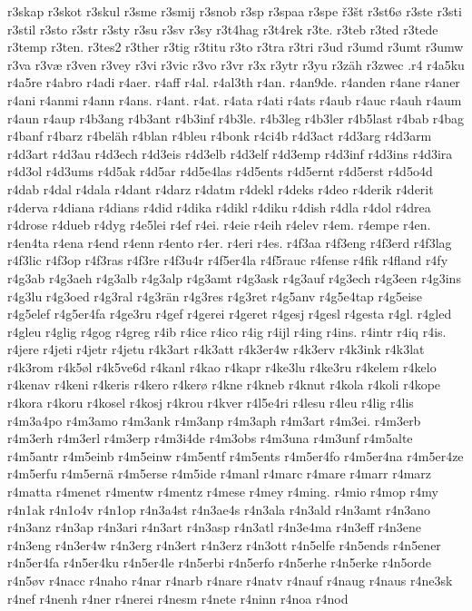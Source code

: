 {{r3skap
r3skot
r3skul
r3sme
r3smij
r3snob
r3sp
r3spaa
r3spe
ř3št
r3st6ø
r3ste
r3sti
r3stil
r3sto
r3str
r3sty
r3su
r3sv
r3sy
r3t4hag
r3t4rek
r3te.
r3teb
r3ted
r3tede
r3temp
r3ten.
r3tes2
r3ther
r3tig
r3titu
r3to
r3tra
r3tri
r3ud
r3umd
r3umt
r3umw
r3va
r3væ
r3ven
r3vey
r3vi
r3vic
r3vo
r3vr
r3x
r3ytr
r3yu
r3zäh
r3zwec
.r4
r4a5ku
r4a5re
r4abro
r4adi
r4aer.
r4aff
r4al.
r4al3th
r4an.
r4an9de.
r4anden
r4ane
r4aner
r4ani
r4anmi
r4ann
r4ans.
r4ant.
r4at.
r4ata
r4ati
r4ats
r4aub
r4auc
r4auh
r4aum
r4aun
r4aup
r4b3ang
r4b3ant
r4b3inf
r4b3le.
r4b3leg
r4b3ler
r4b5last
r4bab
r4bag
r4banf
r4barz
r4beläh
r4blan
r4bleu
r4bonk
r4ci4b
r4d3act
r4d3arg
r4d3arm
r4d3art
r4d3au
r4d3ech
r4d3eis
r4d3elb
r4d3elf
r4d3emp
r4d3inf
r4d3ins
r4d3ira
r4d3ol
r4d3ums
r4d5ak
r4d5ar
r4d5e4las
r4d5ents
r4d5ernt
r4d5erst
r4d5o4d
r4dab
r4dal
r4dala
r4dant
r4darz
r4datm
r4dekl
r4deks
r4deo
r4derik
r4derit
r4derva
r4diana
r4dians
r4did
r4dika
r4dikl
r4diku
r4dish
r4dla
r4dol
r4drea
r4drose
r4dueb
r4dyg
r4e5lei
r4ef
r4ei.
r4eie
r4eih
r4elev
r4em.
r4empe
r4en.
r4en4ta
r4ena
r4end
r4enn
r4ento
r4er.
r4eri
r4es.
r4f3aa
r4f3eng
r4f3erd
r4f3lag
r4f3lic
r4f3op
r4f3ras
r4f3re
r4f3u4r
r4f5er4la
r4f5rauc
r4fense
r4fik
r4fland
r4fy
r4g3ab
r4g3aeh
r4g3alb
r4g3alp
r4g3amt
r4g3ask
r4g3auf
r4g3ech
r4g3een
r4g3ins
r4g3lu
r4g3oed
r4g3ral
r4g3rän
r4g3res
r4g3ret
r4g5anv
r4g5e4tap
r4g5eise
r4g5elef
r4g5er4fa
r4ge3ru
r4gef
r4gerei
r4geret
r4gesj
r4gesl
r4gesta
r4gl.
r4gled
r4gleu
r4glig
r4gog
r4greg
r4ib
r4ice
r4ico
r4ig
r4ijl
r4ing
r4ins.
r4intr
r4iq
r4is.
r4jere
r4jeti
r4jetr
r4jetu
r4k3art
r4k3att
r4k3er4w
r4k3erv
r4k3ink
r4k3lat
r4k3rom
r4k5øl
r4k5ve6d
r4kanl
r4kao
r4kapr
r4ke3lu
r4ke3ru
r4kelem
r4kelo
r4kenav
r4keni
r4keris
r4kero
r4kerø
r4kne
r4kneb
r4knut
r4kola
r4koli
r4kope
r4kora
r4koru
r4kosel
r4kosj
r4krou
r4kver
r4l5e4ri
r4lesu
r4leu
r4lig
r4lis
r4m3a4po
r4m3amo
r4m3ank
r4m3anp
r4m3aph
r4m3art
r4m3ei.
r4m3erb
r4m3erh
r4m3erl
r4m3erp
r4m3i4de
r4m3obs
r4m3una
r4m3unf
r4m5alte
r4m5antr
r4m5einb
r4m5einw
r4m5entf
r4m5ents
r4m5er4fo
r4m5er4na
r4m5er4ze
r4m5erfu
r4m5ernä
r4m5erse
r4m5ide
r4manl
r4marc
r4mare
r4marr
r4marz
r4matta
r4menet
r4mentw
r4mentz
r4mese
r4mey
r4ming.
r4mio
r4mop
r4my
r4n1ak
r4n1o4v
r4n1op
r4n3a4st
r4n3ae4s
r4n3ala
r4n3ald
r4n3amt
r4n3ano
r4n3anz
r4n3ap
r4n3ari
r4n3art
r4n3asp
r4n3atl
r4n3e4ma
r4n3eff
r4n3ene
r4n3eng
r4n3er4w
r4n3erg
r4n3ert
r4n3erz
r4n3ott
r4n5elfe
r4n5ends
r4n5ener
r4n5er4fa
r4n5er4ku
r4n5er4le
r4n5erbi
r4n5erfo
r4n5erhe
r4n5erke
r4n5orde
r4n5øv
r4nacc
r4naho
r4nar
r4narb
r4nare
r4natv
r4nauf
r4naug
r4naus
r4ne3sk
r4nef
r4nenh
r4ner
r4nerei
r4nesm
r4nete
r4ninn
r4noa
r4nod
}}
